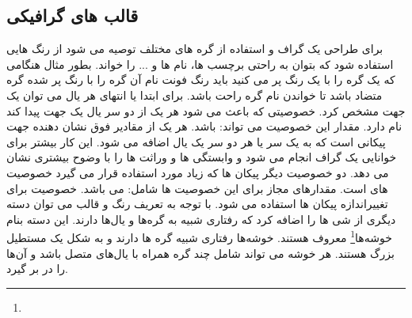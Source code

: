 \subsection{قالب های گرافیکی}
برای طراحی یک گراف و استفاده از گره های مختلف توصیه می شود از رنگ هایی استفاده
شود که بتوان به راحتی برچسب ها، نام ها و ... را خواند. بطور مثال هنگامی که یک
گره را با یک رنگ پر می کنید باید رنگ فونت نام آن گره را با رنگ پر شده گره متضاد
باشد تا خواندن نام گره راحت باشد.
برای ابتدا یا انتهای هر یال می توان یک جهت مشخص کرد. خصوصیتی که باعث می شود هر
یک از دو سر یال یک جهت پیدا کند 
نام دارد. مقدار این خصوصیت می تواند:
باشد. هر یک از مقادیر فوق نشان دهنده جهت پیکانی است که به یک سر یا هر
دو سر یک یال اضافه می شود. این کار بیشتر برای خوانایی یک گراف انجام می شود و
وابستگی ها و وراثت ها را با وضوح بیشتری نشان می دهد. دو خصوصیت دیگر پیکان ها که
زیاد مورد استفاده قرار می گیرد خصوصیت های 
است. مقدارهای مجاز برای این خصوصیت ها شامل:
می باشد. خصوصیت 
برای تغییراندازه پیکان ها استفاده می شود. 
با توجه به تعریف رنگ و قالب می توان دسته دیگری از شی ها را اضافه کرد که رفتاری
شبیه به گره‌ها و یال‌ها دارند. این دسته بنام خوشه‌ها\footnote{}
معروف هستند. خوشه‌ها رفتاری شبیه گره ها دارند و به شکل یک مستطیل بزرگ هستند. هر خوشه
می تواند شامل چند گره همراه با یال‌های متصل باشد و آن‌ها را در بر گیرد.
